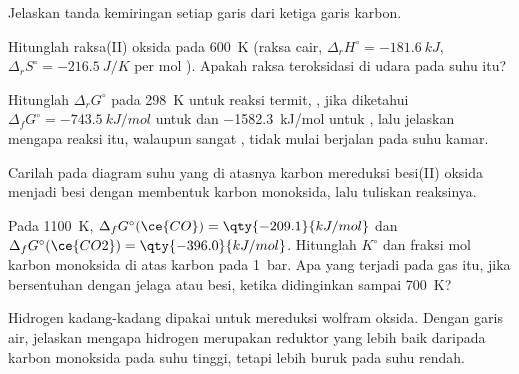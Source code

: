 \begin{exercise}[$\star$]\label{exo:b2:ellingham:4}
Jelaskan tanda kemiringan setiap garis dari ketiga garis karbon.
\end{exercise}

\begin{exercise}[$\star\star$]\label{exo:b2:ellingham:5}
Hitunglah  raksa(II) oksida pada
\qty{600}{K} (raksa cair, $\Delta_r H^\circ = \qty{-181.6}{kJ}$,
$\Delta_r S^\circ =
\qty{-216.5}{J/K}$ per mol ). Apakah raksa
teroksidasi di udara pada suhu itu?
\end{exercise}

\begin{exercise}[$\star\star$]\label{exo:b2:ellingham:6}
Hitunglah $\Delta_r G^\circ$ pada \qty{298}{K} untuk reaksi termit,
, jika diketahui $\Delta_f G^\circ = \qty{-743.5}{kJ/mol}$ untuk  dan \qty{-1582.3}{kJ/mol} untuk
, lalu jelaskan mengapa reaksi itu, walaupun sangat ,
tidak mulai berjalan pada suhu kamar.
\end{exercise}

\begin{exercise}[$\star\star$]\label{exo:b2:ellingham:7}
Carilah pada diagram suhu yang di atasnya karbon mereduksi besi(II)
oksida menjadi besi dengan membentuk karbon monoksida, lalu tuliskan
reaksinya.
\end{exercise}

\begin{exercise}[$\star\star$]\label{exo:b2:ellingham:8}
Pada \qty{1100}{K}, $\Delta_f G^\circ(\ce{CO}) = \qty{-209.1}{kJ/mol}$ dan
$\Delta_f G^\circ(\ce{CO2}) = \qty{-396.0}{kJ/mol}$. Hitunglah $K^\circ$
 dan fraksi mol karbon monoksida di atas karbon pada
\qty{1}{bar}. Apa yang terjadi pada gas itu, jika bersentuhan dengan jelaga
atau besi, ketika didinginkan sampai \qty{700}{K}?
\end{exercise}

\begin{exercise}[$\star\star$]\label{exo:b2:ellingham:9}
Hidrogen kadang-kadang dipakai untuk mereduksi wolfram oksida. Dengan
garis air, jelaskan mengapa hidrogen merupakan reduktor yang lebih baik
daripada karbon monoksida pada suhu tinggi, tetapi lebih buruk pada suhu
rendah.
\end{exercise}

